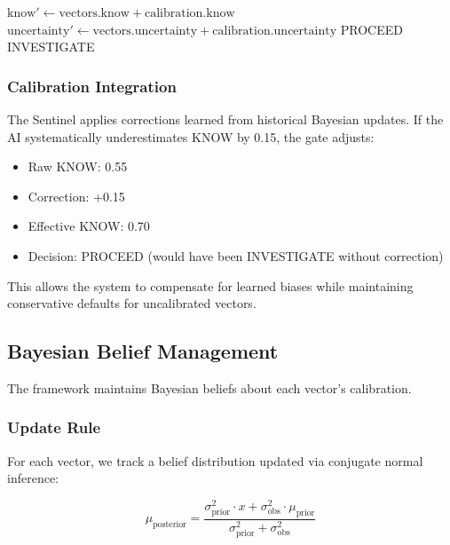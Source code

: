 \begin{algorithm}
\caption{Sentinel Decision}
\label{alg:sentinel}
\begin{algorithmic}[1]
    \State $\text{know}' \gets \text{vectors.know} + \text{calibration.know}$
    \State $\text{uncertainty}' \gets \text{vectors.uncertainty} + \text{calibration.uncertainty}$
        \State \Return PROCEED
    \Else
        \State \Return INVESTIGATE
    \EndIf
\EndProcedure
\end{algorithmic}
\end{algorithm}

\subsubsection{Calibration Integration}

The Sentinel applies corrections learned from historical Bayesian updates. If the AI systematically underestimates KNOW by 0.15, the gate adjusts:

\begin{itemize}
    \item Raw KNOW: 0.55
    \item Correction: +0.15
    \item Effective KNOW: 0.70
    \item Decision: PROCEED (would have been INVESTIGATE without correction)
\end{itemize}

This allows the system to compensate for learned biases while maintaining conservative defaults for uncalibrated vectors.

\subsection{Bayesian Belief Management}

The framework maintains Bayesian beliefs about each vector's calibration.

\subsubsection{Update Rule}

For each vector, we track a belief distribution updated via conjugate normal inference:

\begin{equation}
\mu_{\text{posterior}} = \frac{\sigma^2_{\text{prior}} \cdot x + \sigma^2_{\text{obs}} \cdot \mu_{\text{prior}}}{\sigma^2_{\text{prior}} + \sigma^2_{\text{obs}}}
\end{equation}

